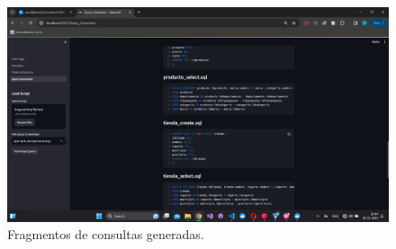 \begin{annexes}
    \begin{figure}
        \centering
        \includegraphics[scale=0.4]{Graphics/generatedquerys1.png}
        \caption{Fragmentos de consultas generadas.}
        \label{fig:qfragment}
    \end{figure}
\end{annexes}